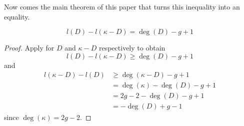 Now comes the main theorem of this paper that turns this inequality into an equality.

\begin{maintheorem}\label{thm:rr}
    $$l(D)-l(\kappa-D)=\deg(D)-g+1$$
\end{maintheorem}

\begin{proof}
    Apply  for $D$ and $\kappa-D$ respectively to obtain
    $$l(D)-l(\kappa-D)\geq\deg(D)-g+1$$
    and
    \begin{align*}
        l(\kappa-D)-l(D) &\geq\deg(\kappa-D)-g+1\\
        &= \deg(\kappa)-\deg(D)-g+1\\
        &= 2g-2-\deg(D)-g+1\\
        &= -\deg(D)+g-1
    \end{align*}
    since $\deg(\kappa)=2g-2$.
\end{proof}
